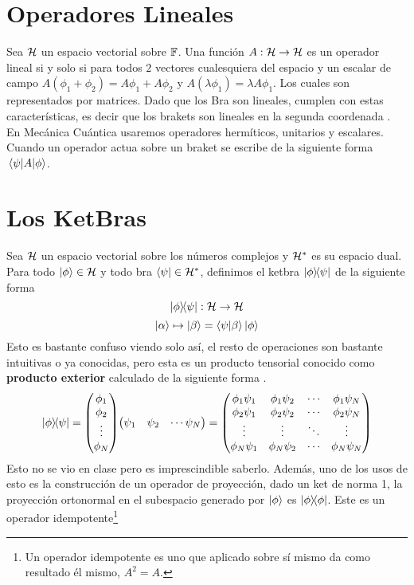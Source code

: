 \section{Operadores Lineales}
Sea $\mathcal{H}$ un espacio vectorial sobre $\mathbb{F}$. Una función $A:\mathcal{H} \to \mathcal{H}$ es un operador lineal si y solo si para todos $2$ vectores cualesquiera del espacio y un escalar de campo $A(\phi _1 + \phi _2) = A\phi_1 + A\phi _2$ y $A(\lambda \phi _1) = \lambda A \phi_1$. Los cuales son representados por matrices. Dado que los Bra son lineales, cumplen con estas características, es decir que los brakets son lineales en la segunda coordenada . En Mecánica Cuántica usaremos operadores hermíticos, unitarios y escalares. Cuando un operador actua sobre un braket se escribe de la siguiente forma $\mel{\psi}{A}{\phi}$.


\section{Los KetBras}
Sea $\mathcal{H}$ un espacio vectorial sobre los números complejos y $\mathcal{H} ^*$ es su espacio dual. Para todo $\ket{\phi} \in \mathcal{H}$ y todo bra $\bra{\psi} \in \mathcal{H} ^*$, definimos el ketbra $\ketbra{\phi}{\psi}$ de la siguiente forma
	$$ \ketbra{\phi}{\psi}:\mathcal{H} \to \mathcal{H} $$
	$$ \ket{\alpha} \mapsto \ket{\beta} = \braket{\psi}{\beta} \ket{\phi} $$
Esto es bastante confuso viendo solo así, el resto de operaciones son bastante intuitivas o ya conocidas, pero esta es un producto tensorial conocido como \textbf{producto exterior} calculado de la siguiente forma .
	$$ \ketbra{\phi}{\psi} = \mqty(\phi_1 \\ \phi_2 \\ \vdots \\ \phi _N) \mqty(\psi _1 & \psi _2 & \cdots \psi _N) = \mqty( \phi _1 \psi_1 & \phi _1 \psi_2 & \cdots & \phi _1 \psi _N \\
						 \phi _2 \psi_1 & \phi _2 \psi_2 & \cdots & \phi _2 \psi _N \\
						 \vdots & \vdots &\ddots & \vdots \\
						 \phi _N \psi_1 & \phi _N \psi_2 & \cdots & \phi _N \psi _N \\ ) $$
Esto no se vio en clase pero es imprescindible saberlo. Además, uno de los usos de esto es la construcción de un operador de proyección, dado un ket de norma 1, la proyección ortonormal en el subespacio generado por $\ket{\phi}$ es $\ketbra{\phi}$. Este es un operador idempotente\footnote{Un operador idempotente es uno que aplicado sobre sí mismo da como resultado él mismo, $A^2 = A$.}


